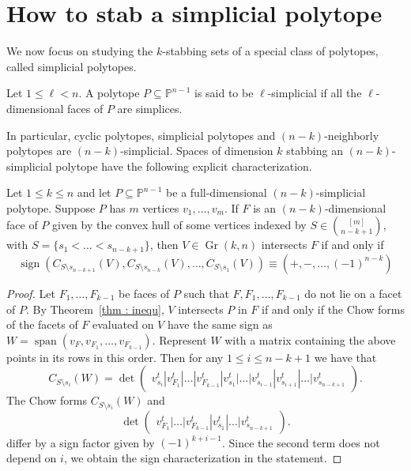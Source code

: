 \documentclass[english]{ourlematema}
\DeclareMathOperator{\Gr}{Gr}
\DeclareMathOperator{\spanv}{span}
\DeclareMathOperator{\sign}{sign}
\newcommand{\PP}{\mathbb{P}}
\begin{document}
\section{How to stab a simplicial polytope}\label{sec : simplicial}

We now focus on studying the $k$-stabbing sets of a special class of polytopes, called simplicial polytopes.
\begin{dfn}
    Let $1 \leq \ell < n$. A polytope $P\subseteq \PP^{n-1}$ is said to be $\ell$-simplicial if all the $\ell$-dimensional faces of $P$ are simplices.
\end{dfn}
In particular, cyclic polytopes, simplicial polytopes and $(n-k)$-neighborly polytopes are $(n-k)$-simplicial.
Spaces of dimension $k$ stabbing an $(n-k)$-simplicial polytope have the following explicit characterization. 

\begin{prop}\label{prop : simplicial}
    Let $1\leq k \leq n$ and let $P\subseteq \PP^{n-1}$ be a full-dimensional $(n-k)$-simplicial polytope. Suppose $P$ has $m$ vertices $v_1,\ldots,v_m$.
    If $F$ is an $(n-k)$-dimensional face of $P$ given by the convex hull of some vertices indexed by $S\in \binom{[m]}{n-k+1}$, with $S=\{ s_1< \ldots< s_{n-k+1} \}$, then $V\in \Gr(k,n)$ intersects $F$ if and only if 
    \[ \sign(C_{S\setminus s_{n-k+1}}(V), C_{S\setminus s_{n-k}}(V), \ldots, C_{S\setminus s_1}(V)) \equiv (+,-,\ldots, (-1)^{n-k}) \]
\end{prop}
\begin{proof}
    Let $F_1,\ldots, F_{k-1}$ be faces of $P$ such that $F,F_1,\ldots,F_{k-1}$ do not lie on a facet of $P$. By Theorem~\ref{thm : inequ}, $V$ intersects $P$ in $F$ if and only if the Chow forms of the facets of $F$ evaluated on $V$ have the same sign as $W = \spanv(v_F, v_{F_1},\ldots, v_{F_{k-1}})$. Represent $W$ with a matrix containing the above points in its rows in this order. Then for any $1\leq i \leq n-k+1$ we have that
    \[ C_{S\setminus s_{i}}(W) = \det\begin{pmatrix}
        v_{s_i}^t | v_{F_1}^t | \ldots | v_{F_{k-1}}^t | v_{s_1}^t| \ldots | v_{s_{i-1}}^t| v_{s_{i+1}}^t| \ldots | v_{s_{n-k+1}}^t
    \end{pmatrix}. \]
    The Chow forms $C_{S\setminus s_{i}}(W)$ and
    \[\det\begin{pmatrix}
         v_{F_1}^t | \ldots | v_{F_{k-1}}^t | v_{s_1}^t| \ldots | v_{s_{n-k+1}}^t
    \end{pmatrix}.\]
    differ by a sign factor given by $(-1)^{k+i-1}$. Since the second term does not depend on $i$, we obtain the sign characterization in the statement.
\end{proof}
\end{document}
